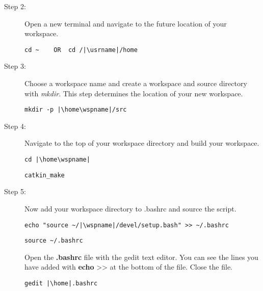 \documentclass[12pt]{article}
\begin{document}
\begin{description}[labelindent=1cm]
\begin{description}
		\item[Step 2:] Open a new terminal and navigate to the future location of your workspace.
		\begin{verbatim}
cd ~	OR	cd /|\usrname|/home
		\end{verbatim}
		
		\item[Step 3:] Choose a workspace name and create a workspace and source directory with {\it mkdir}. This step determines the location of your new workspace.
		\begin{verbatim}
mkdir -p |\home\wspname|/src
		\end{verbatim}
		
		
		\item[Step 4:] Navigate to the top of your workspace directory and build your workspace.
		\begin{verbatim}
cd |\home\wspname|
		\end{verbatim}
		
		\begin{verbatim}
catkin_make
		\end{verbatim}
		
		
		\item [Step 5:]  Now add your workspace directory to .bashrc and source the script.
		\begin{verbatim} 
echo "source ~/|\wspname|/devel/setup.bash" >> ~/.bashrc
		\end{verbatim}
		
		\begin{verbatim} 
source ~/.bashrc 
		\end{verbatim}
		
		\begin{multicols}{2}
		Open the {\bf .bashrc} file with the gedit text editor. You can see the lines you have added with {\bf echo} >> at the bottom of the file. Close the file.  
		\begin{verbatim}  
gedit |\home|.bashrc
		\end{verbatim}
		\end{multicols}
		
		

\end{description}
\end{description}
\end{document}
